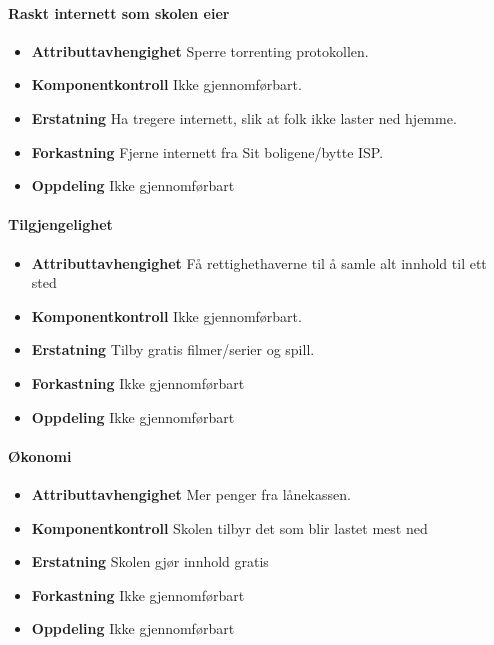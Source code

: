 \paragraph{Raskt internett som skolen eier}
\begin{itemize}
    \item \textbf{Attributtavhengighet} Sperre torrenting protokollen.
    \item \textbf{Komponentkontroll} Ikke gjennomførbart.
    \item \textbf{Erstatning} Ha tregere internett, slik at folk ikke laster ned hjemme.
    \item \textbf{Forkastning} Fjerne internett fra Sit boligene/bytte ISP.
    \item \textbf{Oppdeling} Ikke gjennomførbart
\end{itemize}

\paragraph{Tilgjengelighet}
\begin{itemize}
    \item \textbf{Attributtavhengighet} Få rettighethaverne til å samle alt innhold til ett sted 
    \item \textbf{Komponentkontroll} Ikke gjennomførbart.
    \item \textbf{Erstatning} Tilby gratis filmer/serier og spill.
    \item \textbf{Forkastning} Ikke gjennomførbart
    \item \textbf{Oppdeling} Ikke gjennomførbart
\end{itemize}

\paragraph{Økonomi}
\begin{itemize}
    \item \textbf{Attributtavhengighet} Mer penger fra lånekassen. 
    \item \textbf{Komponentkontroll} Skolen tilbyr det som blir lastet mest ned
    \item \textbf{Erstatning} Skolen gjør innhold gratis
    \item \textbf{Forkastning} Ikke gjennomførbart
    \item \textbf{Oppdeling} Ikke gjennomførbart
\end{itemize}

